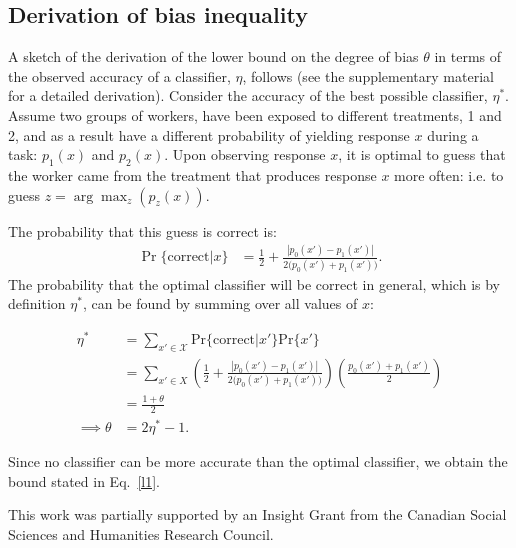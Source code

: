 \documentclass{pnastwo}
\begin{document}
\begin{article}
\begin{materials}
\section{Derivation of bias inequality}
A sketch of the derivation of the lower bound on the degree of bias 
$\theta$ in terms of the observed accuracy of a classifier, $\eta$, follows
(see the supplementary material for a detailed derivation). 
Consider the accuracy of the best possible classifier, $\eta^*$.  
Assume two groups of workers, have been
exposed to different treatments, 1 and 2, and as a result have
a different probability of yielding response $x$ during a task: 
$p_1(x)$ and $p_2(x)$.  Upon observing response $x$, it is optimal to guess 
that the worker came from the treatment that produces response $x$ more 
often: i.e. to guess $z=\arg\max_z(p_z(x))$.

The probability that this guess is correct is:
\begin{align}
	\Pr\{\mathrm{correct}\vert x\} 	&= \frac{1}{2} + \frac{|p_0(x') - p_1(x')|}{2 \big(p_0(x') + p_1(x') \big)}.
\end{align}
The probability that the optimal classifier will be correct in general,
which is by definition $\eta^*$, can be found by summing over all values of 
$x$:

\begin{align}
	\eta^* &= \sum_{x' \in \mathcal{X}} \mathrm{Pr}\{\mathrm{correct}\vert x'\}
			\mathrm{Pr}\{x'\} \\
		&= \sum_{x'\in X} \left(
				\frac{1}{2} + 
				\frac{|p_0(x') - p_1(x')|}{2 \big(p_0(x') + p_1(x') \big)}
			\right)
			\left(
				\frac{p_0(x') + p_1(x')}{2}
			\right)\\
		&= \frac{1 + \theta}{2}\\
		\implies \theta &= 2\eta^* - 1.
\end{align}

Since no classifier can be more accurate than the optimal classifier, we 
obtain the bound stated in Eq.~\ref{l1}.

\end{materials}

\begin{acknowledgments}
This work was partially supported by an Insight Grant from the Canadian Social Sciences and Humanities Research Council.
\end{acknowledgments}





\end{article}
\end{document}
